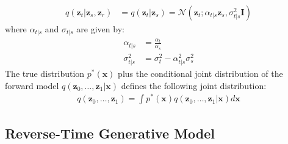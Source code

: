 \documentclass[ oneside,%
                    author={George Herbert},
                    degree={MSci},
                     title={Diffusion Models for Time-Evolving Precipitation Fields},
                  subtitle={}]{dissertation}
\begin{document}
\begin{align}
      q(\mathbf{z}_t|\mathbf{z}_s,\mathbf{z}_r)&=q(\mathbf{z}_t|\mathbf{z}_s)=\mathcal{N}\left(\mathbf{z}_t; \alpha_{t|s}\mathbf{z}_s, \sigma_{t|s}^2\mathbf{I}\right)
\end{align}
where $\alpha_{t|s}$ and $\sigma_{t|s}$ are given by:
\begin{align}
      \alpha_{t|s} &= \frac{\alpha_t}{\alpha_s}\\
      \sigma_{t|s}^2 &= \sigma_t^2-\alpha_{t|s}^2\sigma_s^2
\end{align}
The true distribution $p^*(\mathbf{x})$ plus the conditional joint distribution of the forward model $q(\mathbf{z}_0,\ldots,\mathbf{z}_1|\mathbf{x})$ defines the following joint distribution:
\begin{align}
      q(\mathbf{z}_0,\ldots,\mathbf{z}_1)=\int p^*(\mathbf{x}) q(\mathbf{z}_0,\ldots,\mathbf{z}_1|\mathbf{x}) d\mathbf{x}
\end{align}

\subsection{Reverse-Time Generative Model}
\label{sec:background_diffusion_reverse}
\end{document}
